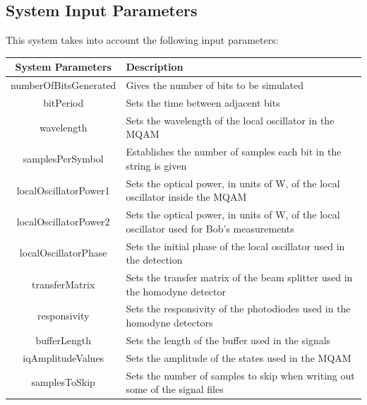 \subsection*{System Input Parameters}

This system takes into account the following input parameters:
\begin{table}[H]
\centering
\begin{tabulary}{1.0\textwidth}{|C|L|}
\hline
\textbf{System Parameters} & \textbf{Description}\\
\hline
numberOfBitsGenerated   & Gives the number of bits to be simulated\\
\hline
bitPeriod               & Sets the time between adjacent bits\\
\hline
wavelength              & Sets the wavelength of the local oscillator in the MQAM\\
\hline
samplesPerSymbol        & Establishes the number of samples each bit in the string is given\\
\hline
localOscillatorPower1   & Sets the optical power, in units of W, of the local oscillator inside the MQAM\\
\hline
localOscillatorPower2   & Sets the optical power, in units of W, of the local oscillator used for Bob's measurements\\
\hline
localOscillatorPhase    & Sets the initial phase of the local oscillator used in the detection\\
\hline
transferMatrix          & Sets the transfer matrix of the beam splitter used in the homodyne detector\\
\hline
responsivity            & Sets the responsivity of the photodiodes used in the homodyne detectors\\
\hline
bufferLength            & Sets the length of the buffer used in the signals\\
\hline
iqAmplitudeValues       & Sets the amplitude of the states used in the MQAM\\
\hline
samplesToSkip           & Sets the number of samples to skip when writing out some of the signal files\\
\hline
\end{tabulary}
\end{table}        

